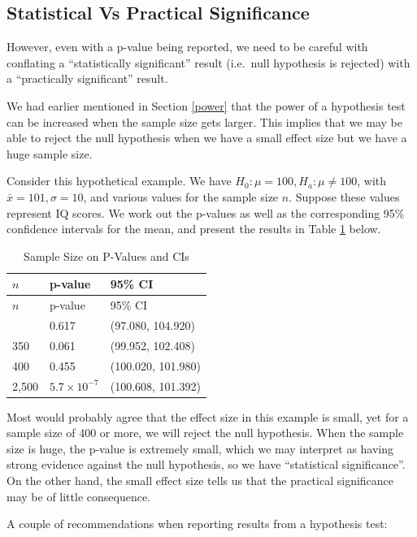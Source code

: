\documentclass[
]{book}
\begin{document}
\subsection{Statistical Vs Practical Significance}\label{statistical-vs-practical-significance}

However, even with a p-value being reported, we need to be careful with conflating a ``statistically significant'' result (i.e.~null hypothesis is rejected) with a ``practically significant'' result.

We had earlier mentioned in Section \ref{power} that the power of a hypothesis test can be increased when the sample size gets larger. This implies that we may be able to reject the null hypothesis when we have a small effect size but we have a huge sample size.

Consider this hypothetical example. We have \(H_0: \mu = 100, H_a: \mu \neq 100\), with \(\bar{x} = 101, \sigma=10\), and various values for the sample size \(n\). Suppose these values represent IQ scores. We work out the p-values as well as the corresponding 95\% confidence intervals for the mean, and present the results in Table \ref{tab:practical} below.

\begin{longtable}[]{@{}lll@{}}
\caption{\label{tab:practical} Sample Size on P-Values and CIs}\tabularnewline
\toprule\noalign{}
\(n\) & p-value & 95\% CI \\
\midrule\noalign{}
\endfirsthead
\toprule\noalign{}
\(n\) & p-value & 95\% CI \\
\midrule\noalign{}
\endhead
\bottomrule\noalign{}
\endlastfoot
25 & 0.617 & (97.080, 104.920) \\
350 & 0.061 & (99.952, 102.408) \\
400 & 0.455 & (100.020, 101.980) \\
2,500 & \(5.7 \times 10^{-7}\) & (100.608, 101.392) \\
\end{longtable}

Most would probably agree that the effect size in this example is small, yet for a sample size of 400 or more, we will reject the null hypothesis. When the sample size is huge, the p-value is extremely small, which we may interpret as having strong evidence against the null hypothesis, so we have ``statistical significance''. On the other hand, the small effect size tells us that the practical significance may be of little consequence.

A couple of recommendations when reporting results from a hypothesis test:
\end{document}
